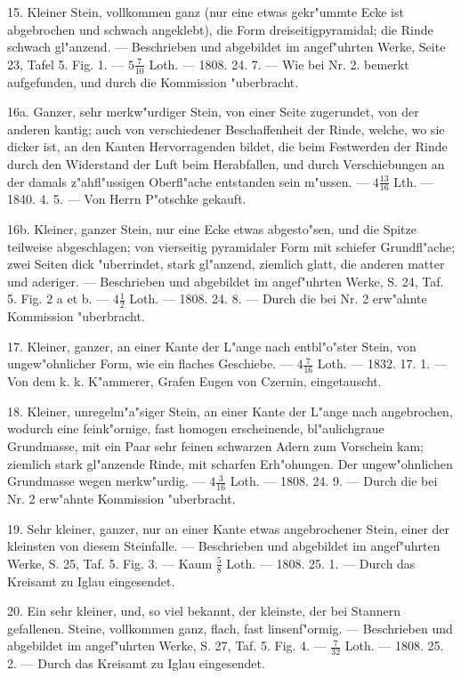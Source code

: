 \documentclass[a4paper, 11pt, oneside, polutonikogreek, german]{article}
\begin{document}
15. Kleiner Stein, vollkommen ganz (nur eine etwas gekr"ummte Ecke ist abgebrochen und schwach angeklebt), die Form dreiseitigpyramidal; die Rinde schwach gl"anzend. --- Beschrieben und abgebildet im angef"uhrten Werke, Seite 23, Tafel 5. Fig. 1. --- $5\frac{7}{10}$ Loth. --- 1808. 24. 7. --- Wie bei Nr. 2. bemerkt aufgefunden, und durch die Kommission "uberbracht.

16a. Ganzer, sehr merkw"urdiger Stein, von einer Seite zugerundet, von der anderen kantig; auch von verschiedener Beschaffenheit der Rinde, welche, wo sie dicker ist, an den Kanten Hervorragenden bildet, die beim Festwerden der Rinde durch den Widerstand der Luft beim Herabfallen, und durch Verschiebungen an der damals z"ahfl"ussigen Oberfl"ache entstanden sein m"ussen. --- $4\frac{13}{16}$ Lth. --- 1840. 4. 5. --- Von Herrn P"otschke gekauft. 

16b. Kleiner, ganzer Stein, nur eine Ecke etwas abgesto"sen, und die Spitze teilweise abgeschlagen; von vierseitig pyramidaler Form mit schiefer Grundfl"ache; zwei Seiten dick "uberrindet, stark gl"anzend, ziemlich glatt, die anderen matter und aderiger. --- Beschrieben und abgebildet im angef"uhrten Werke, S. 24, Taf. 5. Fig. 2 a et b. --- $4\frac{1}{2}$ Loth. --- 1808. 24. 8. --- Durch die bei Nr. 2 erw"ahnte Kommission "uberbracht.

17. Kleiner, ganzer, an einer Kante der L"ange nach entbl"o"ster Stein, von ungew"ohnlicher Form, wie ein flaches Geschiebe. --- $4\frac{7}{16}$ Loth. --- 1832. 17. 1. --- Von dem k. k. K"ammerer, Grafen Eugen von Czernin, eingetauscht.

18. Kleiner, unregelm"a"siger Stein, an einer Kante der L"ange nach angebrochen, wodurch eine feink"ornige, fast homogen erscheinende, bl"aulichgraue Grundmasse, mit ein Paar sehr feinen schwarzen Adern zum Vorschein kam; ziemlich stark gl"anzende Rinde, mit scharfen Erh"ohungen. Der ungew"ohnlichen Grundmasse wegen merkw"urdig. --- $4\frac{3}{16}$ Loth. --- 1808. 24. 9. --- Durch die bei Nr. 2 erw"ahnte Kommission "uberbracht.

19. Sehr kleiner, ganzer, nur an einer Kante etwas angebrochener Stein, einer der kleinsten von diesem Steinfalle. --- Beschrieben und abgebildet im angef"uhrten Werke, S. 25, Taf. 5. Fig. 3. --- Kaum $\frac{5}{8}$ Loth. --- 1808. 25. 1. --- Durch das Kreisamt zu Iglau eingesendet.

20. Ein sehr kleiner, und, so viel bekannt, der kleinste, der bei Stannern gefallenen. Steine, vollkommen ganz, flach, fast linsenf"ormig. --- Beschrieben und abgebildet im angef"uhrten Werke, S. 27, Taf. 5. Fig. 4. --- $\frac{7}{32}$ Loth. --- 1808. 25. 2. --- Durch das Kreisamt zu Iglau eingesendet.
\end{document}
